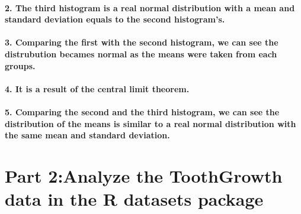 \documentclass[
]{article}
\begin{document}
\hypertarget{the-third-histogram-is-a-real-normal-distribution-with-a-mean-and-standard-deviation-equals-to-the-second-histograms.}{%
\paragraph{2. The third histogram is a real normal distribution with a
mean and standard deviation equals to the second
histogram's.}\label{the-third-histogram-is-a-real-normal-distribution-with-a-mean-and-standard-deviation-equals-to-the-second-histograms.}}

\hypertarget{comparing-the-first-with-the-second-histogram-we-can-see-the-distrubution-becames-normal-as-the-means-were-taken-from-each-groups.}{%
\paragraph{3. Comparing the first with the second histogram, we can see
the distrubution becames normal as the means were taken from each
groups.}\label{comparing-the-first-with-the-second-histogram-we-can-see-the-distrubution-becames-normal-as-the-means-were-taken-from-each-groups.}}

\hypertarget{it-is-a-result-of-the-central-limit-theorem.}{%
\paragraph{4. It is a result of the central limit
theorem.}\label{it-is-a-result-of-the-central-limit-theorem.}}

\hypertarget{comparing-the-second-and-the-third-histogram-we-can-see-the-distribution-of-the-means-is-similar-to-a-real-normal-distribution-with-the-same-mean-and-standard-deviation.}{%
\paragraph{5. Comparing the second and the third histogram, we can see
the distribution of the means is similar to a real normal distribution
with the same mean and standard
deviation.}\label{comparing-the-second-and-the-third-histogram-we-can-see-the-distribution-of-the-means-is-similar-to-a-real-normal-distribution-with-the-same-mean-and-standard-deviation.}}

\hypertarget{part-2analyze-the-toothgrowth-data-in-the-r-datasets-package}{%
\section{Part 2:Analyze the ToothGrowth data in the R datasets
package}\label{part-2analyze-the-toothgrowth-data-in-the-r-datasets-package}}
\end{document}

